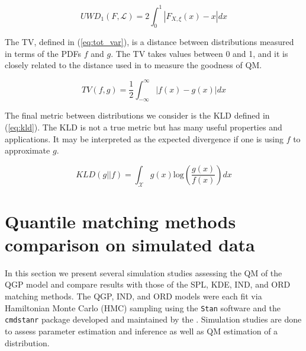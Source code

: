 \documentclass[preprint,12pt,authoryear]{elsarticle}
\begin{document}
\begin{equation}
    \label{eq:pit_wass_dist}
    UWD_1(F, \mathcal{L}) = 2\int_0^1 |F_{X,\xi} (x) - x|dx
\end{equation}



The TV, defined in (\ref{eq:tot_var}), is a distance between distributions measured in terms of the PDFs $f$ and $g$. The TV takes values between 0 and 1, and it is closely related to the distance used in \cite{sgouropoulos2015matching} to measure the goodness of QM.  

\begin{equation}
    \label{eq:tot_var}
    TV(f,g) = \frac{1}{2} \int_{-\infty}^{\infty}|f(x) - g(x) | dx
\end{equation}


The final metric between distributions we consider is the KLD defined in (\ref{eq:kld}). The KLD is not a true metric but has many useful properties and applications. It may be interpreted as the expected divergence if one is using $f$ to approximate $g$. 


\begin{equation}
    \label{eq:kld}
    KLD(g || f) = \int_{\mathcal{X}} g(x) \text{log} \left( \frac{g(x)}{f(x)} \right) dx
\end{equation}



\section{Quantile matching methods comparison on simulated data} \label{sec:simulation_analyses}

In this section we present several simulation studies assessing the QM of the QGP model and compare results with those of the SPL, KDE, IND, and ORD matching methods. The QGP, IND, and ORD models were each fit via Hamiltonian Monte Carlo (HMC) sampling using the \texttt{Stan} software and the \texttt{cmdstanr} package developed and maintained by the \cite{stan2024manual} \cite[]{gabry2022stan}. Simulation studies are done to assess parameter estimation and inference as well as QM estimation of a distribution.
\end{document}
